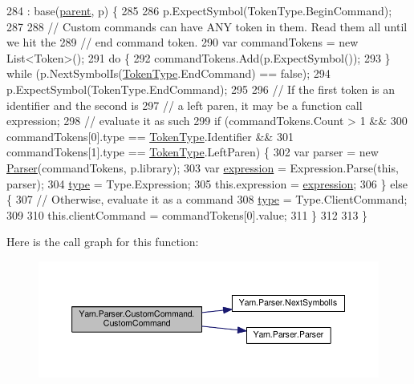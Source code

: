 \begin{DoxyCode}
284                                                                : base(\hyperlink{a00150_af313a82103fcc2ff5a177dbb06b92f7b}{parent}, p) \{
285 
286                 p.ExpectSymbol(TokenType.BeginCommand);
287 
288                 \textcolor{comment}{// Custom commands can have ANY token in them. Read them all until we hit the}
289                 \textcolor{comment}{// end command token.}
290                 var commandTokens = \textcolor{keyword}{new} List<Token>();
291                 \textcolor{keywordflow}{do} \{
292                     commandTokens.Add(p.ExpectSymbol());
293                 \} \textcolor{keywordflow}{while} (p.NextSymbolIs(\hyperlink{a00053_a301aa7c866593a5b625a8fc158bbeace}{TokenType}.EndCommand) == \textcolor{keyword}{false});
294                 p.ExpectSymbol(TokenType.EndCommand);
295 
296                 \textcolor{comment}{// If the first token is an identifier and the second is}
297                 \textcolor{comment}{// a left paren, it may be a function call expression;}
298                 \textcolor{comment}{// evaluate it as such}
299                 \textcolor{keywordflow}{if} (commandTokens.Count > 1 &&
300                     commandTokens[0].type == \hyperlink{a00053_a301aa7c866593a5b625a8fc158bbeace}{TokenType}.Identifier &&
301                     commandTokens[1].type == \hyperlink{a00053_a301aa7c866593a5b625a8fc158bbeace}{TokenType}.LeftParen) \{
302                     var parser = \textcolor{keyword}{new} \hyperlink{a00151_acd2714b911fb5e7c38f0e07a9dc1af58}{Parser}(commandTokens, p.library);
303                     var \hyperlink{a00085_a4250d192d5b58e2404a14c68eb616f16}{expression} = Expression.Parse(\textcolor{keyword}{this}, parser);
304                     \hyperlink{a00085_a5ef3bc96812be224d91548bfcdfd4b92}{type} = Type.Expression;
305                     this.expression = \hyperlink{a00085_a4250d192d5b58e2404a14c68eb616f16}{expression};
306                 \} \textcolor{keywordflow}{else} \{
307                     \textcolor{comment}{// Otherwise, evaluate it as a command}
308                     \hyperlink{a00085_a5ef3bc96812be224d91548bfcdfd4b92}{type} = Type.ClientCommand;
309 
310                     this.clientCommand = commandTokens[0].value;
311                 \}
312 
313             \}
\end{DoxyCode}


Here is the call graph for this function\-:
\nopagebreak
\begin{figure}[H]
\begin{center}
\leavevmode
\includegraphics[width=350pt]{a00085_a49150c9046dcad61d61ce35c51816313_cgraph}
\end{center}
\end{figure}




